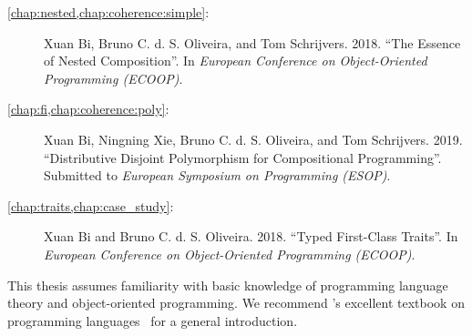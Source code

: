 \begin{description}
\item[\cref{chap:nested,chap:coherence:simple}:] Xuan Bi, Bruno C. d. S.
  Oliveira, and Tom Schrijvers. 2018. ``The Essence of Nested Composition''. In
  \emph{European Conference on Object-Oriented Programming (ECOOP)}.
\item[\cref{chap:fi,chap:coherence:poly}:] Xuan Bi, Ningning Xie, Bruno C. d. S.
  Oliveira, and Tom Schrijvers. 2019. ``Distributive Disjoint Polymorphism for Compositional Programming''. Submitted to
  \emph{European Symposium on Programming (ESOP)}.
\item[\cref{chap:traits,chap:case_study}:] Xuan Bi and Bruno C. d. S. Oliveira.
  2018. ``Typed First-Class Traits''. In \emph{European Conference on Object-Oriented Programming (ECOOP)}.
\end{description}

\noindent\makebox[\linewidth]{\rule{0.7\textwidth}{0.4pt}}

\vspace{1.5\baselineskip}

This thesis assumes familiarity with basic knowledge of programming language
theory and object-oriented programming. We recommend
\citeauthor{DBLP:books/daglib/0005958}'s excellent textbook on programming
languages~\citep{DBLP:books/daglib/0005958} for a general introduction.



